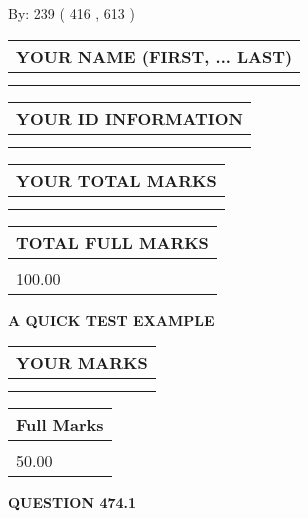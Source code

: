 \documentclass[12pt]{article}
\begin{document}
   
\hspace{1.0in} By: 
 239 ( 416 ,  613 )
   
   
   
   
\newpage 
\setcounter{page}{ 
   474001 } 
   
   
   
   
\noindent\begin{tabular}{|l|}
\hline
YOUR NAME (FIRST, ... LAST)  \\
\hline
 \\ 
 \\ 
\hline
\end{tabular}
\hspace{0.05in} \begin{tabular}{|l|}
\hline
 YOUR   ID   INFORMATION  \\
\hline
 \\ 
 \\ 
\hline
\end{tabular}
   
   
\vspace{0.2in}\noindent\begin{tabular}{|l|}
\hline
YOUR TOTAL MARKS  \\
\hline
 \\ 
 \\ 
\hline
\end{tabular}
\hspace{0.05in} \begin{tabular}{|l|}
\hline
TOTAL FULL MARKS  \\
\hline
 \\ 
100.00 \\
\hline
\end{tabular}
   
   
 \vspace{0.2in}
{\LARGE {\textbf{ A QUICK TEST EXAMPLE}}}
   
   
  
\vspace{0.2in}
  
\noindent\begin{tabular}{|l|}
\hline
 YOUR MARKS  \\
\hline
 \\ 
 \\ 
\hline
\end{tabular}
\hspace{0.05in} \begin{tabular}{|l|}
\hline
 Full Marks  \\
\hline
 \\ 
50.00 \\
\hline
\end{tabular}
{\textbf{\Large{QUESTION
474.1 
}}}
  
\end{document}
